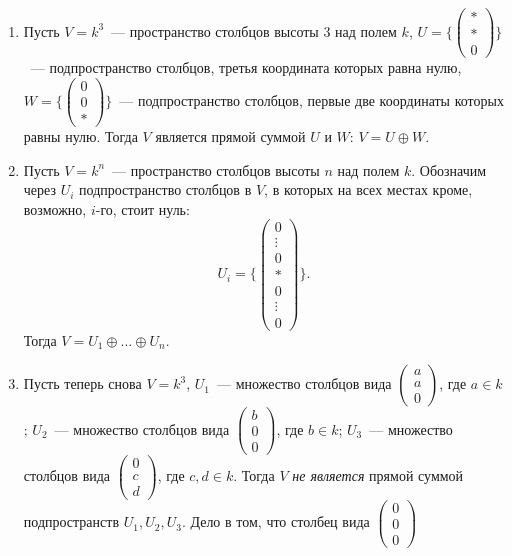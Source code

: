 \begin{examples}
\begin{enumerate}
\item Пусть $V = k^3$~--- пространство столбцов высоты $3$ над полем $k$,
$U = \{\begin{pmatrix} * \\ * \\ 0 \end{pmatrix}\}$~--- подпространство
столбцов, третья координата которых равна нулю,
$W = \{\begin{pmatrix} 0 \\ 0 \\ * \end{pmatrix}\}$~--- подпространство
столбцов, первые две координаты которых равны нулю.
Тогда $V$ является прямой суммой $U$ и $W$: $V = U\oplus W$.
\item Пусть $V = k^n$~--- пространство столбцов высоты $n$ над полем $k$.
Обозначим через $U_i$ подпространство столбцов в $V$, в которых на всех
местах кроме, возможно, $i$-го, стоит нуль:
$$
U_i = \{\begin{pmatrix}0 \\ \vdots \\ 0 \\ * \\ 0 \\ \vdots \\ 0\end{pmatrix}\}.
$$
Тогда $V = U_1\oplus\dots\oplus U_n$.
\item Пусть теперь снова $V = k^3$, $U_1$~--- множество столбцов вида
$\begin{pmatrix} a \\ a \\ 0\end{pmatrix}$, где $a\in k$;
$U_2$~--- множество столбцов вида
$\begin{pmatrix} b \\ 0 \\ 0\end{pmatrix}$, где $b\in k$;
$U_3$~--- множество столбцов вида
$\begin{pmatrix} 0 \\ c \\ d\end{pmatrix}$, где $c,d\in k$.
Тогда $V$ {\em не является} прямой суммой подпространств $U_1, U_2, U_3$.
Дело в том, что столбец вида $\begin{pmatrix}0 \\ 0 \\ 0\end{pmatrix}$

\end{enumerate}
\end{examples}
